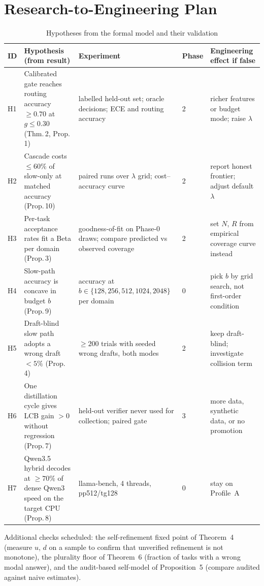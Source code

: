 \documentclass[11pt,a4paper]{article}
\begin{document}
\section{Research-to-Engineering Plan}
\begin{table}[h]\centering\small\caption{Hypotheses from the formal model and their validation}
\begin{tabular}{@{}p{0.7cm}p{5.2cm}p{5.0cm}p{1.0cm}p{2.2cm}@{}}\toprule ID & Hypothesis (from result) & Experiment & Phase & Engineering effect if false\\\midrule
H1 & Calibrated gate reaches routing accuracy $\ge0.70$ at $g\le0.30$ (Thm.\,2, Prop.\,1) & labelled held-out set; oracle decisions; ECE and routing accuracy & 2 & richer features or budget mode; raise $\lambda$\\
H2 & Cascade costs $\le60\%$ of slow-only at matched accuracy (Prop.\,10) & paired runs over $\lambda$ grid; cost--accuracy curve & 2 & report honest frontier; adjust default $\lambda$\\
H3 & Per-task acceptance rates fit a Beta per domain (Prop.\,3) & goodness-of-fit on Phase-0 draws; compare predicted vs observed coverage & 2 & set $N$, $R$ from empirical coverage curve instead\\
H4 & Slow-path accuracy is concave in budget $b$ (Prop.\,9) & accuracy at $b\in\{128,256,512,1024,2048\}$ per domain & 0 & pick $b$ by grid search, not first-order condition\\
H5 & Draft-blind slow path adopts a wrong draft $<5\%$ (Prop.\,4) & $\ge200$ trials with seeded wrong drafts, both modes & 2 & keep draft-blind; investigate collision term\\
H6 & One distillation cycle gives LCB gain $>0$ without regression (Prop.\,7) & held-out verifier never used for collection; paired gate & 3 & more data, synthetic data, or no promotion\\
H7 & Qwen3.5 hybrid decodes at $\ge70\%$ of dense Qwen3 speed on the target CPU (Prop.\,8) & llama-bench, 4 threads, pp512/tg128 & 0 & stay on Profile~A\\
\bottomrule\end{tabular}\end{table}
Additional checks scheduled: the self-refinement fixed point of Theorem~4 (measure $u$, $d$ on a sample to confirm that unverified refinement is not monotone), the plurality floor of Theorem~6 (fraction of tasks with a wrong modal answer), and the audit-based self-model of Proposition~5 (compare audited against naive estimates).
\end{document}
